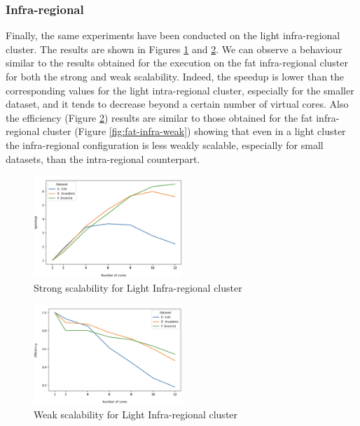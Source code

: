 \documentclass[final,5p,times,twocolumn,authoryear]{elsarticle}
\begin{document}
\subsubsection{Infra-regional}
Finally, the same experiments have been conducted on the light infra-regional cluster. The results are shown in Figures \ref{fig:light-infra-strong} and \ref{fig:light-infra-weak}. We can observe a behaviour similar to the results obtained for the execution on the fat infra-regional cluster for both the strong and weak scalability. Indeed, the speedup is lower than the corresponding values for the light intra-regional cluster, especially for the smaller dataset, and it tends to decrease beyond a certain number of virtual cores. Also the efficiency (Figure \ref{fig:light-infra-weak}) results are similar to those obtained for the fat infra-regional cluster (Figure \ref{fig:fat-infra-weak}) showing that even in a light cluster the infra-regional configuration is less weakly scalable, especially for small datasets, than the intra-regional counterpart. 
\begin{figure}
    \centering
    \includegraphics[width=0.5\textwidth]{images/light_infra_strong.png}
    \caption{Strong scalability for Light Infra-regional cluster }
    \label{fig:light-infra-strong}
\end{figure}
\begin{figure}
    \centering
    \includegraphics[width=0.5\textwidth]{images/light_infra_weak.png}
    \caption{Weak scalability for Light Infra-regional cluster }
    \label{fig:light-infra-weak}
\end{figure}
\end{document}
